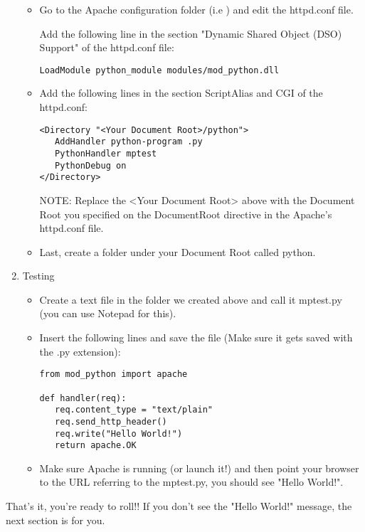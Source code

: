 \begin{enumerate}
\begin{itemize}
\item
Go to the Apache configuration folder (i.e ) and edit the httpd.conf file. 
            
Add the following line in the section "Dynamic Shared Object (DSO)
Support" of the httpd.conf file:

\begin{verbatim}
LoadModule python_module modules/mod_python.dll
\end{verbatim}                    

\item
Add the following lines in the section ScriptAlias and CGI of the httpd.conf: 

\begin{verbatim}                         
<Directory "<Your Document Root>/python">
   AddHandler python-program .py
   PythonHandler mptest
   PythonDebug on
</Directory>
\end{verbatim}                
    
                    
NOTE: Replace the <Your Document Root> above with the Document Root
you specified on the DocumentRoot directive in the Apache's httpd.conf
file.
                    
\item
Last, create a folder under your Document Root called python. 

\end{itemize}

\item
Testing

\begin{itemize}

\item            
Create a text file in the folder we created above and call it mptest.py
(you can use Notepad for this).
     
\item       
Insert the following lines and save the file (Make sure it gets saved
with the .py extension):

\begin{verbatim}                    
from mod_python import apache

def handler(req):
   req.content_type = "text/plain" 
   req.send_http_header()
   req.write("Hello World!")
   return apache.OK
\end{verbatim}                   

\item            
Make sure Apache is running (or launch it!) and then point your
browser to the URL referring to the mptest.py, you should see "Hello
World!".
     
\end{itemize}
\end{enumerate}
       
That's it, you're ready to roll!! If you don't see the "Hello World!"
message, the next section is for you.

